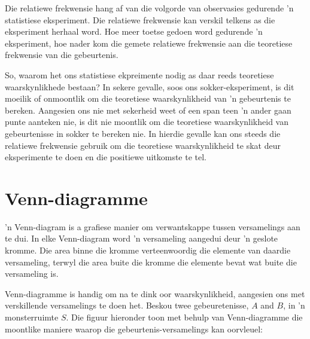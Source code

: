 Die relatiewe frekwensie hang af van die volgorde van observasies gedurende 'n statistiese eksperiment. Die relatiewe frekwensie kan verskil telkens as die eksperiment herhaal word. Hoe meer toetse gedoen word gedurende 'n eksperiment, hoe nader kom die gemete relatiewe frekwensie aan die teoretiese frekwensie van die gebeurtenis.\par

So, waarom het ons statistiese ekpreimente nodig as daar reeds teoretiese waarskynlikhede bestaan? In sekere gevalle, soos ons sokker-eksperiment, is dit moeilik of onmoontlik om die teoretiese waarskynlikheid van 'n gebeurtenis te bereken. Aangesien ons nie met sekerheid weet of een span teen 'n ander gaan punte aanteken nie, is dit nie moontlik om die teoretiese waarskynlikheid van gebeurtenisse in sokker te bereken nie. In hierdie gevalle kan ons steeds die relatiewe frekwensie gebruik om die teoretiese waarskynlikheid te skat deur eksperimente te doen en die positiewe uitkomste te tel.

\section{Venn-diagramme}
'n Venn-diagram is a grafiese manier om verwantskappe tussen versamelings aan te dui. In elke Venn-diagram word 'n versameling aangedui deur 'n geslote kromme. Die area binne die kromme verteenwoordig die elemente van daardie versameling, terwyl die area buite die kromme die elemente bevat wat buite die versameling is.
\par


Venn-diagramme is handig om na te dink oor waarskynlikheid, aangesien ons met verskillende versamelings te doen het. Beskou twee gebeuretenisse, $A$ and $B$, in 'n monsterruimte $S$. Die figuur hieronder toon met behulp van Venn-diagramme die moontlike maniere waarop die gebeurtenis-versamelings kan oorvleuel:


